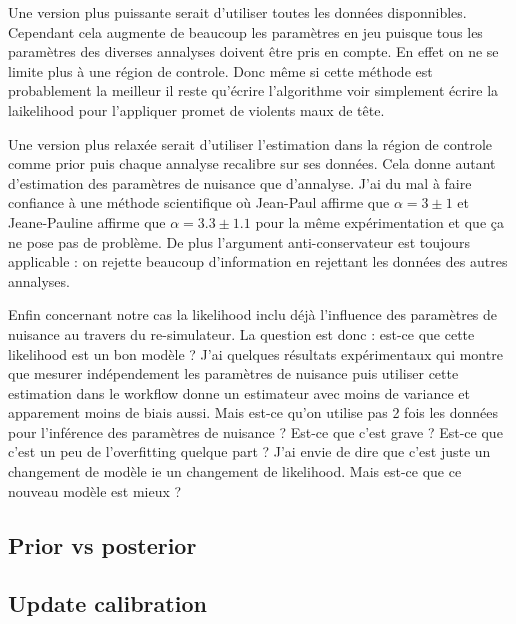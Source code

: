 Une version plus puissante serait d'utiliser toutes les données disponnibles.
Cependant cela augmente de beaucoup les paramètres en jeu puisque tous les paramètres des diverses annalyses doivent être pris en compte.
En effet on ne se limite plus à une région de controle.
Donc même si cette méthode est probablement la meilleur il reste qu'écrire l'algorithme voir simplement écrire la laikelihood pour l'appliquer promet de violents maux de tête.

Une version plus relaxée serait d'utiliser l'estimation dans la région de controle comme prior puis chaque annalyse recalibre sur ses données.
Cela donne autant d'estimation des paramètres de nuisance que d'annalyse.
J'ai du mal à faire confiance à une méthode scientifique où Jean-Paul affirme que $\alpha = 3 \pm 1$ et Jeane-Pauline affirme que $\alpha = 3.3 \pm 1.1$ pour la même expérimentation et que ça ne pose pas de problème.
De plus l'argument anti-conservateur est toujours applicable : on rejette beaucoup d'information en rejettant les données des autres annalyses.

Enfin concernant notre cas la likelihood inclu déjà l'influence des paramètres de nuisance au travers du re-simulateur.
La question est donc : est-ce que cette likelihood est un bon modèle ?
J'ai quelques résultats expérimentaux qui montre que mesurer indépendement les paramètres de nuisance puis utiliser cette estimation dans le workflow donne un estimateur avec moins de variance et apparement moins de biais aussi.
Mais est-ce qu'on utilise pas 2 fois les données pour l'inférence des paramètres de nuisance ?
Est-ce que c'est grave ? Est-ce que c'est un peu de l'overfitting quelque part ?
J'ai envie de dire que c'est juste un changement de modèle ie un changement de likelihood.
Mais est-ce que ce nouveau modèle est mieux ?




\subsection{Prior vs posterior} %
\label{sub:prior_vs_posterior}






\subsection{Update calibration} %
\label{sub:update_calibration}

